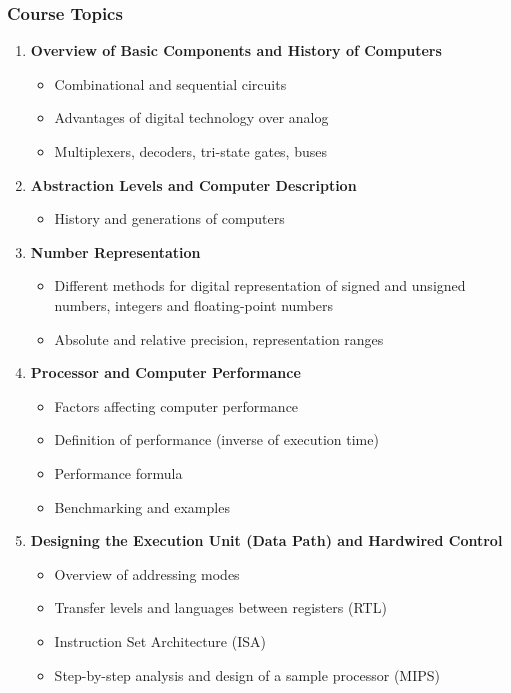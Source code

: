 \documentclass[12pt]{article}
\begin{document}
\subsubsection*{Course Topics}
\begin{enumerate}
    \item \textbf{Overview of Basic Components and History of Computers}
        \begin{itemize}
            \item Combinational and sequential circuits
            \item Advantages of digital technology over analog
            \item Multiplexers, decoders, tri-state gates, buses
        \end{itemize}
    
    \item \textbf{Abstraction Levels and Computer Description}
        \begin{itemize}
            \item History and generations of computers
        \end{itemize}
    
    \item \textbf{Number Representation}
        \begin{itemize}
            \item Different methods for digital representation of signed and unsigned numbers, integers and floating-point numbers
            \item Absolute and relative precision, representation ranges
        \end{itemize}
    
    \item \textbf{Processor and Computer Performance}
        \begin{itemize}
            \item Factors affecting computer performance
            \item Definition of performance (inverse of execution time)
            \item Performance formula
            \item Benchmarking and examples
        \end{itemize}
    
    \item \textbf{Designing the Execution Unit (Data Path) and Hardwired Control}
        \begin{itemize}
            \item Overview of addressing modes
            \item Transfer levels and languages between registers (RTL)
            \item Instruction Set Architecture (ISA)
            \item Step-by-step analysis and design of a sample processor (MIPS)
        \end{itemize}
    

\end{enumerate}
\end{document}
